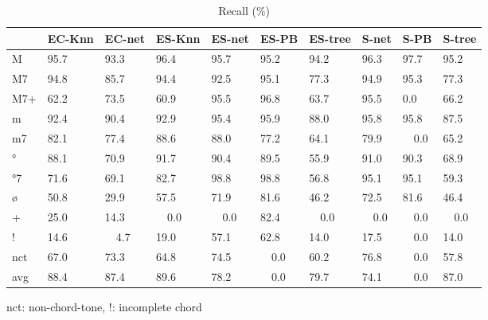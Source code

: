 \documentclass{article}
\begin{document}
\begin{table}
  \centering
  \begin{tabular}{l|p{.5cm}p{.5cm}p{.5cm}p{.5cm}p{.5cm}p{.5cm}p{.5cm}p{.5cm}p{.5cm}}

   & EC-Knn&EC-net&ES-Knn&ES-net&ES-PB &ES-tree&S-net &S-PB  &S-tree \\
\hline                                                
M  & 95.7  & 93.3 & 96.4 &95.7  & 95.2 & 94.2  &96.3  & 97.7 &  95.2 \\
M7 & 94.8  & 85.7 & 94.4 &92.5  & 95.1 & 77.3  &94.9  & 95.3 &  77.3 \\
M7+& 62.2  & 73.5 & 60.9 &95.5  & 96.8 & 63.7  &95.5  &  0.0 &  66.2 \\
m  & 92.4  & 90.4 & 92.9 &95.4  & 95.9 & 88.0  &95.8  & 95.8 &  87.5 \\
m7 & 82.1  & 77.4 & 88.6 &88.0  & 77.2 & 64.1  &79.9  & ~~0.0 &  65.2 \\
°  & 88.1  & 70.9 & 91.7 &90.4  & 89.5 & 55.9  &91.0  & 90.3 &  68.9 \\
°7 & 71.6  & 69.1 & 82.7 &98.8  & 98.8 & 56.8  &95.1  & 95.1 &  59.3 \\
ø  & 50.8  & 29.9 & 57.5 &71.9  & 81.6 & 46.2  &72.5  & 81.6 &  46.4 \\
+  & 25.0  & 14.3 & ~~0.0 &~~0.0  & 82.4 & ~~0.0  &~~0.0  & ~~0.0 &  ~~0.0 \\
!  & 14.6  & ~~4.7 & 19.0 &57.1  & 62.8 & 14.0  &17.5  & ~~0.0 &  14.0 \\
nct& 67.0  & 73.3 & 64.8 &74.5  & ~~0.0 & 60.2  &76.8  & ~~0.0 &  57.8 \\
avg& 88.4  & 87.4 & 89.6 &78.2  & ~~0.0 & 79.7  &74.1  & ~~0.0 &  87.0 \\
  \end{tabular}                                                        

\medskip

nct: non-chord-tone, !: incomplete chord
  \caption{Recall (\%)}
  \label{tab:recall}
\end{table}
\end{document}
